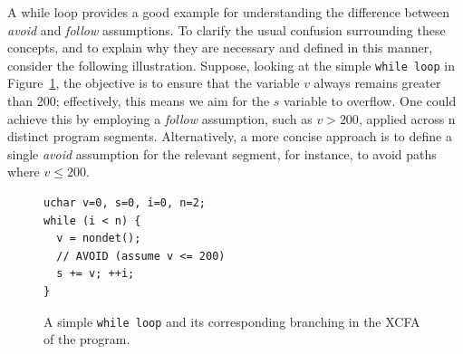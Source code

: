A while loop provides a good example for understanding the difference between 
\emph{avoid} and \emph{follow} assumptions.
To clarify the usual confusion surrounding these concepts, and to explain why they 
are necessary and defined in this manner, consider the following illustration.
Suppose, looking at the simple \texttt{while loop} in Figure~\ref{fig:avoid vs follow}, the objective is 
to ensure that the variable $v$ always remains greater than 200; effectively, this means 
we aim for the $s$ variable to overflow.
One could achieve this by employing a \emph{follow} assumption, such as $v > 200$, 
applied across n distinct program segments.
Alternatively, a more concise approach is to define a single \emph{avoid} 
assumption for the relevant segment, for instance, to avoid paths where $v \le 200$.

\begin{figure}[H]
  \centering
  \begin{minipage}[t]{0.40\textwidth}
    \begin{lstlisting}[style=c]
uchar v=0, s=0, i=0, n=2;
while (i < n) {
  v = nondet(); 
  // AVOID (assume v <= 200)
  s += v; ++i;
}\end{lstlisting}
  \end{minipage}

  \caption{A simple \texttt{while loop} and its corresponding branching in the XCFA of the program.}
  \label{fig:avoid vs follow}
\end{figure}


